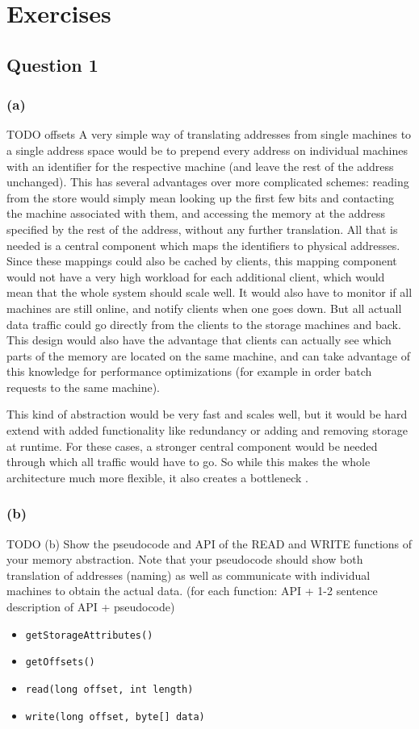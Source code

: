 \documentclass[12pt,a4paper]{article}
\begin{document}
\section*{Exercises} 
\label{sec:exercises}

\subsection*{Question 1}
\label{sec:eq1}
\subsubsection*{(a)}
TODO offsets
A very simple way of translating addresses from single machines to a single address space would be to prepend every address on individual machines with an identifier for the respective machine (and leave the rest of the address unchanged). This has several advantages over more complicated schemes: reading from the store would simply mean looking up the first few bits and contacting the machine associated with them, and accessing the memory at the address specified by the rest of the address, without any further translation. All that is needed is a central component which maps the identifiers to physical addresses. Since these mappings could also be cached by clients, this mapping component would not have a very high workload for each additional client, which would mean that the whole system should scale well. It would also have to monitor if all machines are still online, and notify clients when one goes down. But all actuall data traffic could go directly from the clients to the storage machines and back. This design would also have the advantage that clients can actually see which parts of the memory are located on the same machine, and can take advantage of this knowledge for performance optimizations (for example in order batch requests to the same machine).

This kind of abstraction would be very fast and scales well, but it would be hard extend with added functionality like redundancy or adding and removing storage at runtime. For these cases, a stronger central component would be needed through which all traffic would have to go. So while this makes the whole architecture much more flexible, it also creates a bottleneck .
\subsubsection*{(b)}
TODO
(b) Show the pseudocode and API of the READ and WRITE functions of your memory abstraction.
Note that your pseudocode should show both translation of addresses (naming) as well as
communicate with individual machines to obtain the actual data. (for each function: API + 1-2
sentence description of API + pseudocode)
\begin{itemize}
  \item \texttt{getStorageAttributes()}
  \item \texttt{getOffsets()}
  \item \texttt{read(long offset, int length)}
  \item \texttt{write(long offset, byte[] data)}
\end{itemize}
\end{document}
